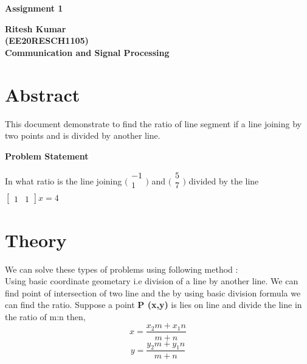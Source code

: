 \documentclass[10pt, twocolumn]{article}
\begin{document}
	
	\begin{titlepage}
		\begin{center}
			\vspace*{1cm}
			
			\textbf{ \huge{Assignment 1}}
			\vspace{1.5cm}
			
			\textbf{Ritesh Kumar} \\
			\textbf{(EE20RESCH1105)}\\
			\textbf{Communication and Signal Processing}
			\date{Today}
			
		\end{center}
	\end{titlepage}
\section{Abstract}
This document demonstrate to find  the ratio of line segment if a line joining by two points and is divided by another line.	
\hspace{10cm}

\begin{center}
{\textbf{Problem Statement}} \\	
\end{center}
\hspace{4cm}
In what ratio is the line joining   $ \bigl(\begin{smallmatrix}
-1\\ 
1 \\
\end{smallmatrix}\bigr)$ and $ \bigl(\begin{smallmatrix}
	5\\ 
	7 \\
\end{smallmatrix}\bigr) $ divided by the line $ \begin{bmatrix}
1 &  1
\end{bmatrix}x = 4$
	
	
	\section{Theory}
	We can solve these types of problems using following method : \\
Using  basic coordinate geometary i.e division of a line by another line. We can find  point of intersection of two line and the by using basic division formula we can find the ratio.
	Suppose a point \textbf{P (x,y)} is lies on  line  and divide the line in the ratio of m:n then, \\
	\begin{equation}
	 x = \frac{x_{2}m + x_{1}n}{m+n}
\end{equation}
\begin{equation}
 y = \frac{y_{2}m + y_{1}n}{m+n}
\end{equation}
	  
\end{document}
